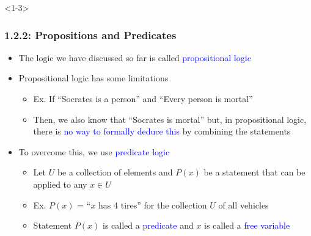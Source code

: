 \documentclass[10pt,english,aspectratio=169]{beamer}
\begin{document}
\begin{frame}<1-3> \frametitle{1.2.2: Propositions and Predicates}

\begin{itemize}
\setlength\itemsep{4mm}
\item<1-> The logic we have discussed so far is called \textcolor{blue}{propositional logic}

\item<2-> Propositional logic has some limitations  \vspace{1mm}
\begin{itemize}
 \setlength\itemsep{1.5mm}
 \item Ex. If ``Socrates is a person'' and ``Every person is mortal''
 \item Then, we also know that ``Socrates is mortal'' but, in propositional logic, there is \textcolor{blue}{no way to formally deduce this} by combining the statements 
\end{itemize}

\item<3-> To overcome this, we use \textcolor{blue}{predicate logic} \vspace{1mm}
\begin{itemize}
 \setlength\itemsep{1.5mm}
 \item Let $U$ be a collection of elements and $P(x)$ be a statement that can be applied to any $x\in U$
 \item Ex. $P(x)$ = ``$x$ has 4 tires'' for the collection $U$ of all vehicles
 \item Statement $P(x)$ is called a \textcolor{blue}{predicate} and $x$ is called a \textcolor{blue}{free variable}
\end{itemize}
\end{itemize}


\end{frame}
\end{document}
